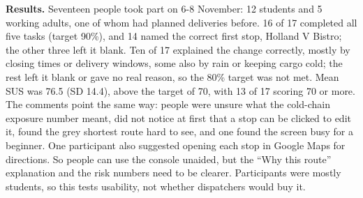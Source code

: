 \documentclass[10.5pt,a4paper]{article}
\begin{document}
\textbf{Results.} Seventeen people took part on 6-8 November: 12 students and 5 working adults, one of whom had
planned deliveries before. 16 of 17 completed all five tasks (target 90\%), and 14 named the correct first stop, Holland V
Bistro; the other three left it blank. Ten of 17 explained the change correctly, mostly by closing times or delivery
windows, some also by rain or keeping cargo cold; the rest left it blank or gave no real reason, so the 80\% target was not
met. Mean SUS was 76.5 (SD 14.4), above the target of 70, with 13 of 17 scoring 70 or more. The comments point the same way:
people were unsure what the cold-chain exposure number meant, did not notice at first that a stop can be clicked to edit
it, found the grey shortest route hard to see, and one found the screen busy for a beginner. One participant also suggested
opening each stop in Google Maps for directions. So people can use the console unaided, but the ``Why this route''
explanation and the risk numbers need to be clearer. Participants were mostly students, so this tests usability, not
whether dispatchers would buy it.

\end{document}
